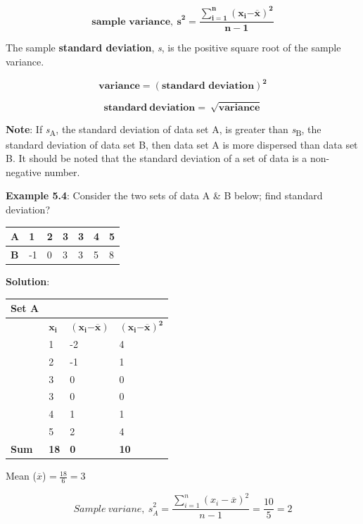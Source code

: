\documentclass[
]{book}
\begin{document}
\[{\mathbf{\text{sample variance}},\ \mathbf{s}}^{\mathbf{2}}\mathbf{=}\frac{\sum_{\mathbf{i = 1}}^{\mathbf{n}}\left( \mathbf{x}_{\mathbf{i}}\mathbf{-}\overline{\mathbf{x}} \right)^{\mathbf{2}}}{\mathbf{n - 1}}\]

The sample \textbf{standard deviation}, \emph{s}, is the positive square root of
the sample variance.

\[\mathbf{variance =}\left( \mathbf{\text{standard deviation}} \right)^{\mathbf{2}}\]

\[\mathbf{standard\ deviation = \ }\sqrt{\mathbf{\text{variance}}}\]

\textbf{Note}: If \emph{s}\textsubscript{A}, the standard deviation of data set A, is greater
than \emph{s}\textsubscript{B}, the standard deviation of data set B, then data set A is
more dispersed than data set B. It should be noted that the standard
deviation of a set of data is a non-negative number.

\textbf{Example 5.4}: Consider the two sets of data A \& B below; find standard
deviation?

\begin{longtable}[]{@{}lllllll@{}}
\toprule
\textbf{A} & 1 & 2 & 3 & 3 & 4 & 5 \\
\midrule
\endhead
\textbf{B} & -1 & 0 & 3 & 3 & 5 & 8 \\
\bottomrule
\end{longtable}

\textbf{Solution}:

\begin{longtable}[]{@{}llll@{}}
\toprule
\textbf{Set A} & & & \\
\midrule
\endhead
& \(\mathbf{x}_{\mathbf{i}}\) & \(\left( \mathbf{x}_{\mathbf{i}}\mathbf{-}\overline{\mathbf{x}} \right)\) & \(\left( \mathbf{x}_{\mathbf{i}}\mathbf{-}\overline{\mathbf{x}} \right)^{\mathbf{2}}\) \\
& 1 & -2 & 4 \\
& 2 & -1 & 1 \\
& 3 & 0 & 0 \\
& 3 & 0 & 0 \\
& 4 & 1 & 1 \\
& 5 & 2 & 4 \\
\textbf{Sum} & \textbf{18} & \textbf{0} & \textbf{10} \\
\bottomrule
\end{longtable}

Mean (\(\overline{x}\)) =\(\ \frac{18}{6} = 3\)

\[{Sample\ variane,\ s}_{A}^{2} = \frac{\sum_{i = 1}^{n}\left( x_{i} - \overline{x} \right)^{2}}{n - 1} = \frac{10}{5} = 2\]
\end{document}
